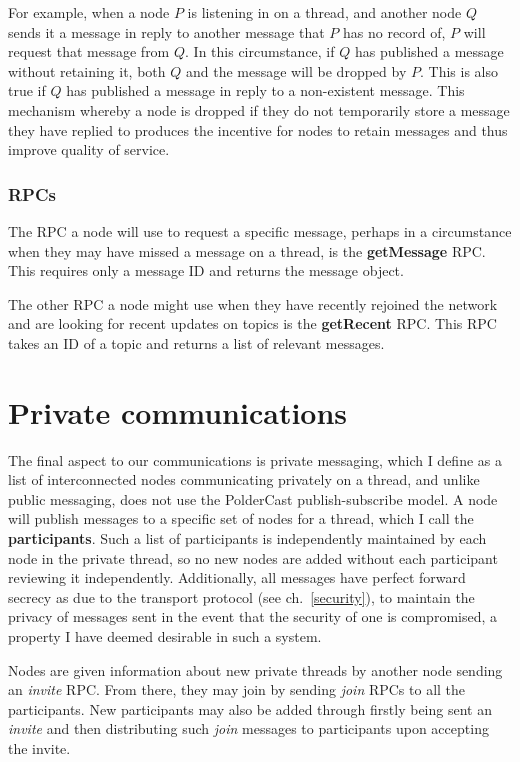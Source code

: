\documentclass[10pt,a4paper,onecolumn]{article}
\begin{document}
For example, when a node $P$ is listening in on a thread, and another node $Q$ sends it a message in reply to another message that $P$ has no record of, $P$ will request that message from $Q$. In this circumstance, if $Q$ has published a message without retaining it, both $Q$ and the message will be dropped by $P$. This is also true if $Q$ has published a message in reply to a non-existent message. This mechanism whereby a node is dropped if they do not temporarily store a message they have replied to produces the incentive for nodes to retain messages and thus improve quality of service.

\subsubsection*{RPCs}
The RPC a node will use to request a specific message, perhaps in a circumstance when they may have missed a message on a thread, is the \textbf{getMessage} RPC. This requires only a message ID and returns the message object. 

The other RPC a node might use when they have recently rejoined the network and are looking for recent updates on topics is the \textbf{getRecent} RPC. This RPC takes an ID of a topic and returns a list of relevant messages.

\section{Private communications}
\label{private}
The final aspect to our communications is private messaging, which I define as a list of interconnected nodes communicating privately on a thread, and unlike public messaging, does not use the PolderCast publish-subscribe model. A node will publish messages to a specific set of nodes for a thread, which I call the \textbf{participants}. Such a list of participants is independently maintained by each node in the private thread, so no new nodes are added without each participant reviewing it independently. Additionally, all messages have perfect forward secrecy as due to the transport protocol (see ch.~\ref{security}), to maintain the privacy of messages sent in the event that the security of one is compromised, a property I have deemed desirable in such a system. 

Nodes are given information about new private threads by another node sending an \textit{invite} RPC. From there, they may join by sending \textit{join} RPCs to all the participants. New participants may also be added through firstly being sent an \textit{invite} and then distributing such \textit{join} messages to participants upon accepting the invite.
\end{document}
